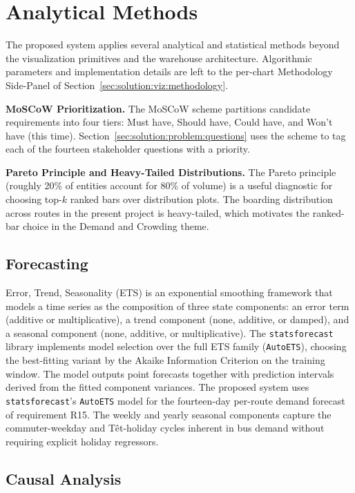 \section{Analytical Methods}
\label{sec:foundations:methods}

The proposed system applies several analytical and statistical methods
beyond the visualization primitives and the warehouse architecture.
Algorithmic parameters and implementation details are left to the
per-chart Methodology Side-Panel of
Section~\ref{sec:solution:viz:methodology}.

\noindent\textbf{MoSCoW Prioritization.}
The MoSCoW scheme partitions candidate requirements into four tiers:
Must have, Should have, Could have, and Won't have (this time).
Section~\ref{sec:solution:problem:questions} uses the scheme to tag
each of the fourteen stakeholder questions with a priority.

\noindent\textbf{Pareto Principle and Heavy-Tailed Distributions.}
The Pareto principle (roughly 20\% of entities account for 80\% of
volume) is a useful diagnostic for choosing top-$k$ ranked bars over
distribution plots. The boarding distribution across routes in the
present project is heavy-tailed, which motivates the ranked-bar
choice in the Demand and Crowding theme.

\subsection{Forecasting}
\label{sec:foundations:methods:prophet}

Error, Trend, Seasonality (ETS) is an exponential smoothing framework
that models a time series as the composition of three state components:
an error term (additive or multiplicative), a trend component (none,
additive, or damped), and a seasonal component (none, additive, or
multiplicative). The \texttt{statsforecast} library
\cite{statsforecast} implements model selection over the full ETS
family (\texttt{AutoETS}), choosing the best-fitting variant by the
Akaike Information Criterion on the training window. The model outputs
point forecasts together with prediction intervals derived from the
fitted component variances. The proposed system uses
\texttt{statsforecast}'s \texttt{AutoETS} model for the fourteen-day
per-route demand forecast of requirement R15. The weekly and yearly
seasonal components capture the commuter-weekday and T\^et-holiday
cycles inherent in bus demand without requiring explicit holiday
regressors.

\subsection{Causal Analysis}
\label{sec:foundations:methods:did}


